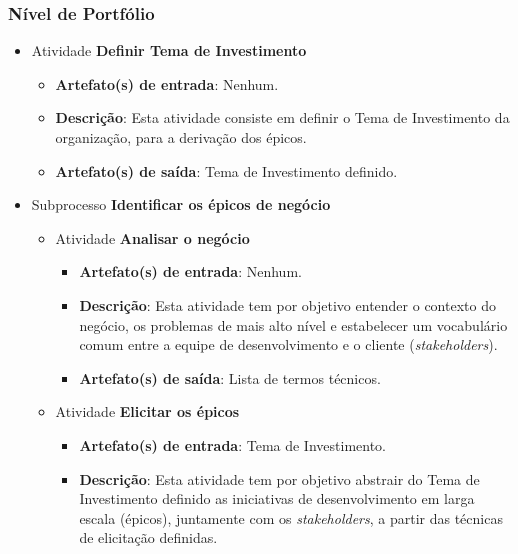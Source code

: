 
  \subsubsection{Nível de Portfólio}
    
    \begin{itemize}
     
     \item Atividade \textbf{Definir Tema de Investimento}
	
	\begin{itemize}
	  \item \textbf{Artefato(s) de entrada}: Nenhum.
	  
	  \item \textbf{Descrição}: Esta atividade consiste em definir o Tema de Investimento da organização,
	    para a derivação dos épicos.
	  
	  \item \textbf{Artefato(s) de saída}: Tema de Investimento definido.
	 	 
	\end{itemize}
	
     \item Subprocesso \textbf{Identificar os épicos de negócio}
	
	\begin{itemize}
	 \item Atividade \textbf{Analisar o negócio}
	     
	     \begin{itemize}
		\item \textbf{Artefato(s) de entrada}: Nenhum.
		
		\item \textbf{Descrição}: Esta atividade tem por objetivo entender o contexto do negócio, os problemas de mais alto nível
		  e estabelecer um vocabulário comum entre a equipe de desenvolvimento e o cliente (\textit{stakeholders}).
		
		\item \textbf{Artefato(s) de saída}: Lista de termos técnicos.
		  
	      \end{itemize}
	  
	  \item Atividade \textbf{Elicitar os épicos}
	  
	      \begin{itemize}
		\item \textbf{Artefato(s) de entrada}: Tema de Investimento.
		
		\item \textbf{Descrição}: Esta atividade tem por objetivo abstrair do Tema de Investimento definido as
		  iniciativas de desenvolvimento em larga escala (épicos), juntamente com os \textit{stakeholders},
		  a partir das técnicas de elicitação definidas.
		

\end{itemize}
\end{itemize}
\end{itemize}
